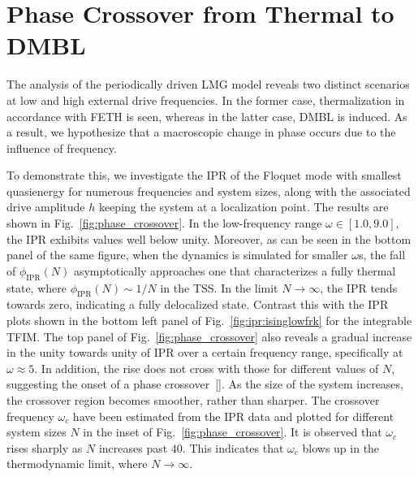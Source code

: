 \documentclass[%
reprint,
superscriptaddress,
amsmath,amssymb,
aps,
prb,
showkeys,
]{revtex4-2}
\begin{document}
\section{\label{sec:level5}Phase Crossover from Thermal to DMBL}
The analysis of the periodically driven LMG model reveals two distinct scenarios at low and high external drive frequencies. In the former case, thermalization in accordance with FETH is seen, whereas in the latter case, DMBL is induced. As a result, we hypothesize that a macroscopic change in phase occurs due to the influence of frequency. 

To demonstrate this, we investigate the IPR of the  Floquet mode with smallest quasienergy for numerous frequencies and system sizes, along with the associated drive amplitude $h$ keeping the system at a localization point. The results are shown in Fig.~\ref{fig:phase_crossover}. In the low-frequency range $\omega \in \left[1.0, 9.0\right]$, the IPR exhibits values well below unity.   {Moreover, as can be seen in the bottom panel of the same figure, when the dynamics is simulated for smaller} $\omega$s, the fall of $\phi_\mathrm{IPR}(N)$ {asymptotically approaches one that characterizes a fully thermal state, where} $\phi_\mathrm{IPR}(N)\sim 1/N$ in the TSS.  In the limit  $N\rightarrow\infty$, the IPR tends towards zero, indicating a fully delocalized state. Contrast this with the IPR plots shown in the bottom left panel of Fig.~\ref{fig:ipr:isinglowfrk} for the integrable TFIM.  The top panel of Fig.~\ref{fig:phase_crossover} also reveals a gradual increase in the unity towards unity of IPR over a certain frequency range, specifically at $\omega \approx 5$. In addition, the rise does not cross with those for different values of $N$, suggesting the onset of a phase crossover~[\cite{sierant_2023, sachdev_quantum_2011}]. As the size of the system increases, the crossover region becomes smoother, rather than sharper.  The crossover frequency $\omega_c$ have been estimated from the IPR data and plotted for different system sizes $N$ in the inset of Fig.~\ref{fig:phase_crossover}. It is observed that $\omega_c$ rises sharply as $N$ increases past $40$. This indicates that $\omega_c$ blows up in the thermodynamic limit, where $N \to \infty$.
\end{document}

